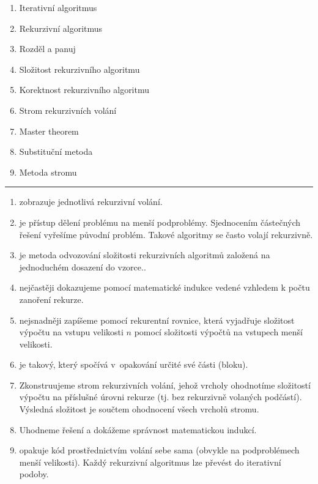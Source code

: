 \documentclass[12pt,a4paper,landscape]{article}
\begin{document}
\pagestyle{empty}

\setlength{\parindent}{0pt}
\setlength{\columnsep}{20pt}

\Large

\begin{multicols}{2}
\begin{enumerate}
\item Iterativní algoritmus
\item Rekurzivní algoritmus
\item Rozděl a panuj
\item Složitost rekurzivního algoritmu
\item Korektnost rekurzivního algoritmu
\item Strom rekurzivních volání
\item Master theorem
\item Substituční metoda
\item Metoda stromu
\end{enumerate}
\end{multicols}

\rule{\linewidth}{1pt}

\begin{multicols}{2}
\begin{enumerate}[label=\Alph*]

\item zobrazuje jednotlivá rekurzivní volání.

\item je přístup dělení problému na menší podproblémy.
Sjednocením částečných řešení vyřešíme původní problém. Takové
algoritmy se často volají rekurzivně.
\item je metoda odvozování složitosti rekurzivních algoritmů založená na
jednoduchém dosazení do vzorce..
\item nejčastěji dokazujeme pomocí matematické indukce vedené vzhledem k počtu
zanoření rekurze.
\item nejsnadněji zapíšeme pomocí rekurentní rovnice, která vyjadřuje složitost
výpočtu na vstupu velikosti $n$ pomocí složitosti výpočtů na vstupech menší
velikosti.
\item je takový, který spočívá v~opakování určité své části (bloku).
\item Zkonstruujeme strom rekurzivních volání, jehož vrcholy ohodnotíme složitostí
výpočtu na příslušné úrovni rekurze (tj. bez rekurzivně volaných podčástí).
Výsledná složitost je součtem ohodnocení všech vrcholů stromu.
\item Uhodneme řešení a dokážeme správnost matematickou indukcí.
\item opakuje kód prostřednictvím volání sebe sama (obvykle na podproblémech menší
velikosti). Každý rekurzivní algoritmus lze převést do iterativní podoby.
\end{enumerate}

\end{multicols}
\end{document}
